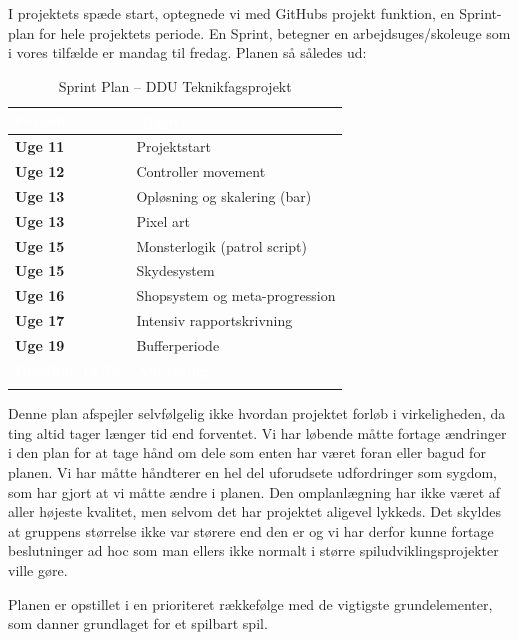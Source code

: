 I projektets spæde start, optegnede vi med GitHubs projekt funktion, en Sprint-plan for hele projektets periode. En Sprint, betegner en arbejdsuges/skoleuge som i vores tilfælde er mandag til fredag. Planen så således ud:

\begin{table}[H]
\centering
\renewcommand{\arraystretch}{1.4}
\begin{tabular}{>{\bfseries}l l}
    \toprule
    \rowcolor{headerblue}
    \textcolor{white}{\textbf{Periode}} & \textcolor{white}{\textbf{Opgave}} \\
    \midrule
    Uge 11 & Projektstart \\
    \rowcolor{lightgray}
    Uge 12 & Controller movement \\
    Uge 13 & Opløsning og skalering (bar) \\
    \rowcolor{lightgray}
    Uge 13 & Pixel art \\
    Uge 15 & Monsterlogik (patrol script) \\
    \rowcolor{lightgray}
    Uge 15 & Skydesystem \\
    Uge 16 & Shopsystem og meta-progression \\
    \rowcolor{lightgray}
    Uge 17 & Intensiv rapportskrivning \\
    Uge 19 & Bufferperiode \\
    \rowcolor{deadlinered}
    \textcolor{white}{Deadline 18/05} & \textcolor{white}{\textbf{Aflevering}} \\
    \rowcolor{lightgray}
    \bottomrule
\end{tabular}
\caption{Sprint Plan – DDU Teknikfagsprojekt}
\end{table}

Denne plan afspejler selvfølgelig ikke hvordan projektet forløb i virkeligheden, da ting altid tager længer tid end forventet. 
Vi har løbende måtte fortage ændringer i den plan for at tage hånd om dele som enten har været foran eller bagud for planen. Vi har måtte håndterer en hel del uforudsete udfordringer som sygdom, som har gjort at vi måtte ændre i planen. Den omplanlægning har ikke været af aller højeste kvalitet, men selvom det har projektet aligevel lykkeds. Det skyldes at gruppens størrelse ikke var størere end den er og vi har derfor kunne fortage beslutninger ad hoc som man ellers ikke normalt i større spiludviklingsprojekter ville gøre.

Planen er opstillet i en prioriteret rækkefølge med de vigtigste grundelementer, som danner grundlaget for et spilbart spil.



